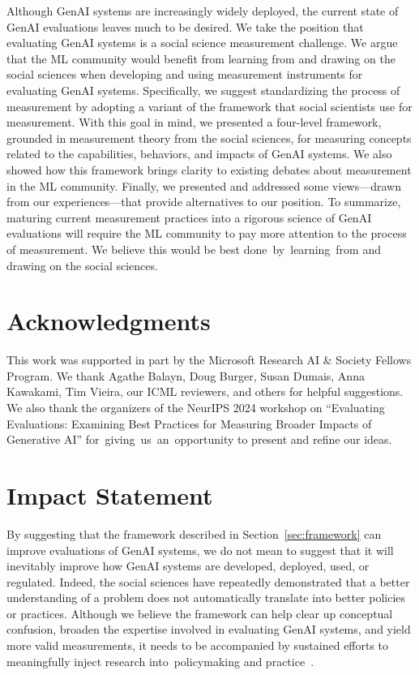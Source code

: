 \documentclass{article}
\begin{document}
Although GenAI systems are increasingly widely deployed, 
the current state of GenAI evaluations leaves much to be desired. We take the position that evaluating GenAI systems is a social science measurement challenge. We argue that the ML community would benefit from learning from and drawing on the social sciences when developing and using measurement instruments for evaluating GenAI systems. Specifically, we suggest standardizing the process of measurement by adopting a variant of the framework that social scientists use for measurement. With this goal in mind, we presented a four-level framework, grounded in measurement theory from the social sciences, for measuring concepts related to the capabilities, behaviors, and impacts of GenAI systems. We also showed how this framework brings clarity to existing debates about measurement in the ML community. Finally, we presented and addressed some views---drawn from our experiences---that provide alternatives to our position. To summarize, maturing current measurement practices into a rigorous science of GenAI evaluations will require the ML community to pay more attention to the process of measurement. We believe this would be best done~by~learning~from and drawing on the social sciences.

\section*{Acknowledgments}

This work was supported in part by the Microsoft Research AI \& Society Fellows Program. We thank Agathe Balayn, Doug Burger, Susan Dumais, Anna Kawakami, Tim Vieira, our ICML reviewers, and others for helpful suggestions. We also thank the organizers of the NeurIPS 2024 workshop on ``Evaluating Evaluations: Examining Best Practices for Measuring Broader Impacts of Generative AI'' for~giving~us~an~opportunity to present and refine our ideas.

\section*{Impact Statement}

By suggesting that the framework described in Section~\ref{sec:framework} can improve evaluations of GenAI systems, we do not mean to suggest that it will inevitably improve how GenAI systems are developed, deployed, used, or regulated. Indeed, the social sciences have repeatedly demonstrated that a better understanding of a problem does not automatically translate into better policies or practices. Although we believe the framework can help clear up conceptual confusion, broaden the expertise involved in evaluating GenAI systems, and yield more valid measurements, it needs to be accompanied by sustained efforts to meaningfully inject research into~policymaking and practice~\citep[e.g.,][]{cooper2024unlearning}.
\end{document}
